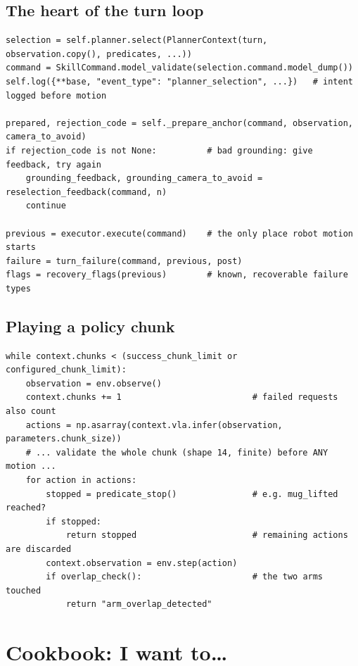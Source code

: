 \documentclass[11pt,a4paper]{article}
\newcommand{\srcref}[1]{{\small\color{stone}\faCode\ \texttt{\detokenize{#1}}}}
\begin{document}
\subsection{The heart of the turn loop}
\begin{lstlisting}[numbers=none,caption={\srcref{harness/runtime/orchestrator.py:268} (abridged)}]
selection = self.planner.select(PlannerContext(turn, observation.copy(), predicates, ...))
command = SkillCommand.model_validate(selection.command.model_dump())
self.log({**base, "event_type": "planner_selection", ...})   # intent logged before motion

prepared, rejection_code = self._prepare_anchor(command, observation, camera_to_avoid)
if rejection_code is not None:          # bad grounding: give feedback, try again
    grounding_feedback, grounding_camera_to_avoid = reselection_feedback(command, n)
    continue

previous = executor.execute(command)    # the only place robot motion starts
failure = turn_failure(command, previous, post)
flags = recovery_flags(previous)        # known, recoverable failure types
\end{lstlisting}

\subsection{Playing a policy chunk}
\begin{lstlisting}[numbers=none,caption={\srcref{harness/skills/vla_act.py:68} (abridged)}]
while context.chunks < (success_chunk_limit or configured_chunk_limit):
    observation = env.observe()
    context.chunks += 1                          # failed requests also count
    actions = np.asarray(context.vla.infer(observation, parameters.chunk_size))
    # ... validate the whole chunk (shape 14, finite) before ANY motion ...
    for action in actions:
        stopped = predicate_stop()               # e.g. mug_lifted reached?
        if stopped:
            return stopped                       # remaining actions are discarded
        context.observation = env.step(action)
        if overlap_check():                      # the two arms touched
            return "arm_overlap_detected"
\end{lstlisting}

\section{Cookbook: I want to\ldots}
\end{document}
